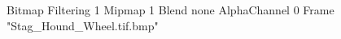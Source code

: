 {Bitmap
	{Filtering 1}
	{Mipmap 1}
	{Blend none}
	{AlphaChannel 0}
	{Frame "Stag_Hound_Wheel.tif.bmp"}
}
